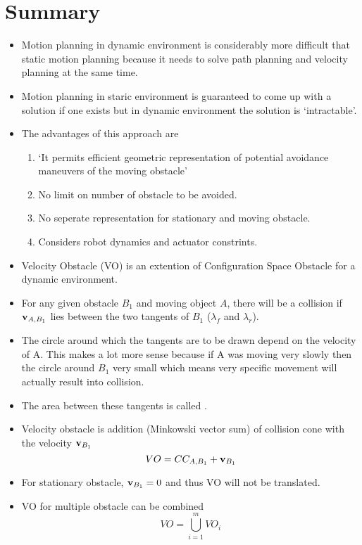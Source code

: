 \documentclass[12pt]{article}
\begin{document}
\section{Summary}
\begin{itemize}
    \item Motion planning in dynamic environment is considerably more difficult that static motion planning because it needs to solve path planning and velocity planning at the same time.
    \item Motion planning in staric environment is guaranteed to come up with a solution if one exists but in dynamic environment the solution is `intractable'.
    \item The advantages of this approach are
        \begin{enumerate}
            \item `It permits efficient geometric representation of potential avoidance maneuvers of the moving obstacle'
            \item No limit on number of obstacle to be avoided.
            \item No seperate representation for stationary and moving obstacle.
            \item Considers robot dynamics and actuator constrints.
        \end{enumerate}
    \item Velocity Obstacle (VO) is an extention of Configuration Space Obstacle for a dynamic environment.
    \item For any given obstacle $B_1$ and moving object $A$, there will be a collision if $\bold{v}_{A,B_1}$ lies between the two tangents of $B_1$ ($\lambda_f$ and $\lambda_r$).
    \item The circle around which the tangents are to be drawn depend on the velocity of A. This makes a lot more sense because if A was moving very slowly then the circle around $B_1$ very small which means very specific movement will actually result into collision.
    \item The area between these tangents is called .
    \item Velocity obstacle is addition (Minkowski vector sum) of collision cone with the velocity $\bold{v}_{B_1}$ $$VO = CC_{A,B_1} + \bold{v}_{B_1}$$
    \item For stationary obstacle, $\bold{v}_{B_1} = 0$ and thus VO will not be translated.
    \item VO for multiple obstacle can be combined $$VO = \bigcup^{m}_{i=1}VO_i$$

\end{itemize}
\end{document}
